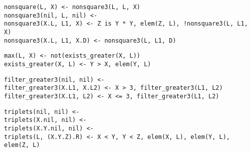 \documentclass[11pt]{article}
\newcounter{lem}\setcounter{lem}{0}
\begin{document}
\begin{verbatim}
nonsquare(L, X) <- nonsquare3(L, L, X)
nonsquare3(nil, L, nil) <-
nonsquare3(X.L, L1, X) <- Z is Y * Y, elem(Z, L), !nonsquare3(L, L1, X)
nonsquare3(X.L, L1, X.D) <- nonsquare3(L, L1, D)
\end{verbatim}
\begin{verbatim}
max(L, X) <- not(exists_greater(X, L))
exists_greater(X, L) <- Y > X, elem(Y, L)
\end{verbatim}
\begin{verbatim}
filter_greater3(nil, nil) <-
filter_greater3(X.L1, X.L2) <- X > 3, filter_greater3(L1, L2)
filter_greater3(X.L1, L2) <- X <= 3, filter_greater3(L1, L2)
\end{verbatim}
\begin{verbatim}
triplets(nil, nil) <-
triplets(X.nil, nil) <-
triplets(X.Y.nil, nil) <-
triplets(L, (X.Y.Z).R) <- X < Y, Y < Z, elem(X, L), elem(Y, L), elem(Z, L)
\end{verbatim}
\end{document}

